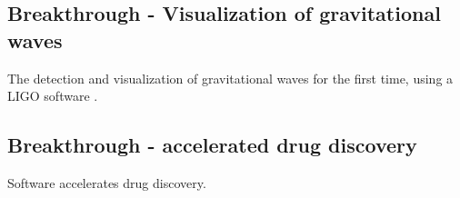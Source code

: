 \subsection{Breakthrough - Visualization of gravitational waves }
The detection and visualization of gravitational waves for the first time, using a \ac{LIGO} software \citep{enwiki:1047100294, mukherji2017report}. 

\subsection{Breakthrough - accelerated drug discovery }
Software accelerates drug discovery\citep{bhati2021pandemic}.



